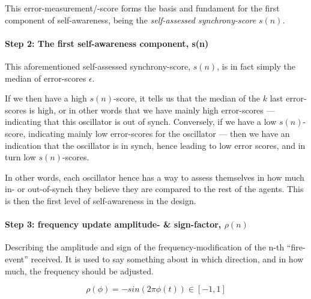 		This error-measurement/-score forms the basis and fundament for the first component of self-awareness, being the \textit{self-assessed synchrony-score} $s(n)$.


		\paragraph{Step 2: The first self-awareness component, s(n)}
		\label{s_n}
		This aforementioned self-assessed synchrony-score, $s(n)$, is in fact simply the median of error-scores $\epsilon$.

		If we then have a high $s(n)$-score, it tells us that the median of the $k$ last error-scores is high, or in other words that we have mainly high error-scores — indicating that this oscillator is out of synch. Conversely, if we have a low $s(n)$-score, indicating mainly low error-scores for the oscillator — then we have an indication that the oscillator is in synch, hence leading to low error scores, and in turn low $s(n)$-scores. 

		In other words, each oscillator hence has a way to assess themselves in how much in- or out-of-synch they believe they are compared to the rest of the agents. This is then the first level of self-awareness in the design.

		\paragraph{Step 3: frequency update amplitude- \& sign-factor, $\rho(n)$}

		Describing the amplitude and sign of the frequency-modification of the n-th ``fire-event'' received. It is used to say something about in which direction, and in how much, the frequency should be adjusted.

		\begin{equation}
		\label{amp_sign_freq_adj}
			\rho(\phi) = - sin(2\pi\phi(t)) \in [-1, 1]
		\end{equation}


